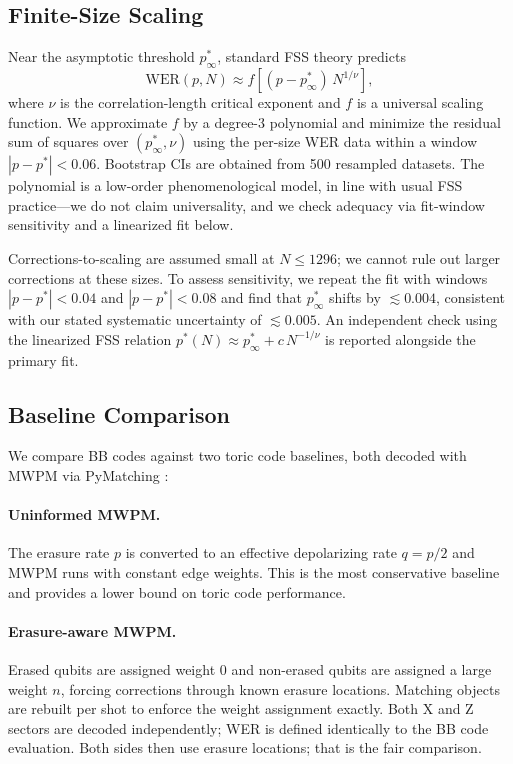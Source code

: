 \documentclass[twocolumn,10pt]{article}
\begin{document}
\subsection{Finite-Size Scaling}\label{sec:fss}

Near the asymptotic threshold $p^*_\infty$, standard FSS theory predicts
\begin{equation}
    \mathrm{WER}(p, N) \approx f\!\left[(p - p^*_\infty)\, N^{1/\nu}\right],
\end{equation}
where $\nu$ is the correlation-length critical exponent and $f$ is a universal scaling function.
We approximate $f$ by a degree-3 polynomial and minimize the residual sum of squares over
$(p^*_\infty, \nu)$ using the per-size WER data within a window $|p - p^*| < 0.06$.
Bootstrap CIs are obtained from 500 resampled datasets.
The polynomial is a low-order phenomenological model, in line with usual FSS practice---we
do not claim universality, and we check adequacy via fit-window sensitivity and a
linearized fit below.

Corrections-to-scaling are assumed small at $N \leq 1296$; we cannot rule out larger
corrections at these sizes.
To assess sensitivity, we repeat the fit with windows $|p - p^*| < 0.04$ and
$|p - p^*| < 0.08$ and find that $p^*_\infty$ shifts by $\lesssim 0.004$, consistent with
our stated systematic uncertainty of $\lesssim 0.005$.
An independent check using the linearized FSS relation $p^*(N) \approx p^*_\infty + c\,N^{-1/\nu}$
is reported alongside the primary fit.

\subsection{Baseline Comparison}

We compare BB codes against two toric code baselines, both decoded with MWPM
via PyMatching \cite{pymatching}:

\paragraph{Uninformed MWPM.}
The erasure rate $p$ is converted to an effective depolarizing rate $q = p/2$ and MWPM runs
with constant edge weights.
This is the most conservative baseline and provides a lower bound on toric code performance.

\paragraph{Erasure-aware MWPM.}
Erased qubits are assigned weight 0 and non-erased qubits are assigned a large weight $n$,
forcing corrections through known erasure locations.
Matching objects are rebuilt per shot to enforce the weight assignment exactly.
Both X and Z sectors are decoded independently; WER is defined identically to the BB code
evaluation.
Both sides then use erasure locations; that is the fair comparison.
\end{document}
